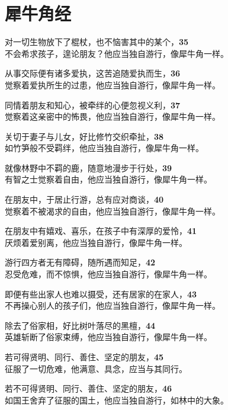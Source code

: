 \section{犀牛角经}


对一切生物放下了棍杖，也不恼害其中的某个，\hfill{\grayfootnotesize \textbf{35}} \\
不会希求孩子，遑论朋友？他应当独自游行，像犀牛角一样。


从事交际便有诸多爱执，这苦追随爱执而生，\hfill{\grayfootnotesize \textbf{36}} \\
觉察着爱执所生的过患，他应当独自游行，像犀牛角一样。


同情着朋友和知心，被牵绊的心便忽视义利，\hfill{\grayfootnotesize \textbf{37}} \\
觉察着这亲密中的怖畏，他应当独自游行，像犀牛角一样。


关切于妻子与儿女，好比修竹交织牵扯，\hfill{\grayfootnotesize \textbf{38}} \\
如竹笋般不受羁绊，他应当独自游行，像犀牛角一样。


就像林野中不羁的鹿，随意地漫步于行处，\hfill{\grayfootnotesize \textbf{39}} \\
有智之士觉察着自由，他应当独自游行，像犀牛角一样。


在朋友中，于居止行游，总有应对商谈，\hfill{\grayfootnotesize \textbf{40}} \\
觉察着不被渴求的自由，他应当独自游行，像犀牛角一样。


在朋友中有嬉戏、喜乐，在孩子中有深厚的爱怜，\hfill{\grayfootnotesize \textbf{41}} \\
厌烦着爱别离，他应当独自游行，像犀牛角一样。


游行四方者无有障碍，随所遇而知足，\hfill{\grayfootnotesize \textbf{42}} \\
忍受危难，而不惊惧，他应当独自游行，像犀牛角一样。


即便有些出家人也难以摄受，还有居家的在家人，\hfill{\grayfootnotesize \textbf{43}} \\
不再操心别人的孩子们，他应当独自游行，像犀牛角一样。


除去了俗家相，好比树叶落尽的黑檀，\hfill{\grayfootnotesize \textbf{44}} \\
英雄斩断了俗家束缚，他应当独自游行，像犀牛角一样。


若可得贤明、同行、善住、坚定的朋友，\hfill{\grayfootnotesize \textbf{45}} \\
征服了一切危难，他满意、具念，应当与其同行。


若不可得贤明、同行、善住、坚定的朋友，\hfill{\grayfootnotesize \textbf{46}} \\
如国王舍弃了征服的国土，他应当独自游行，如林中的大象。


